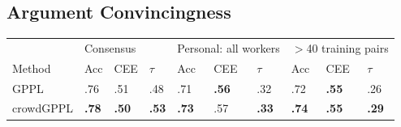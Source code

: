 \subsection{Argument Convincingness}\label{sec:exp_scale}


\begin{table}
 \centering
 \small
 \setlength{\tabcolsep}{4pt}
\begin{tabular}{ l l l l@{\hskip 1.0cm} l l l@{\hskip 1.0cm} l l l}
\hline
 & \multicolumn{3}{l}{Consensus} & 
 \multicolumn{3}{l}{Personal: all workers} &\multicolumn{3}{l}{$>$40 training pairs} \\
 Method & Acc & CEE & $\tau$ & Acc & CEE & $\tau$ & Acc & CEE & $\tau$ \\ 
  \midrule
 GPPL %
  & .76 & .51 & .48 & .71 &  \textbf{.56} & .32 & .72 &  \textbf{.55} & .26 \\ %
 crowdGPPL %
 & \textbf{.78} & \textbf{.50} & \textbf{.53} & \textbf{.73} & .57 & \textbf{.33} & \textbf{.74} & \textbf{.55} & \textbf{.29}  \\ %

\end{tabular}
\end{table}
